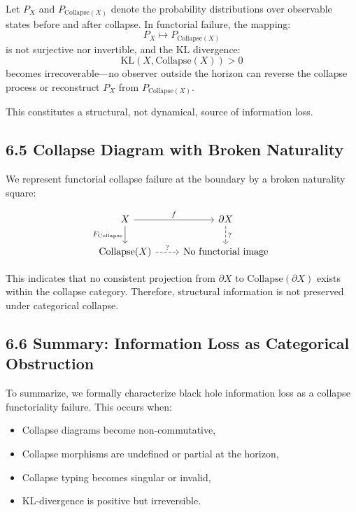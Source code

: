 \documentclass[11pt]{article}
\begin{document}
Let \( P_X \) and \( P_{\mathrm{Collapse}(X)} \) denote the probability distributions over observable states before and after collapse. In functorial failure, the mapping:
\[
P_X \mapsto P_{\mathrm{Collapse}(X)}
\]
is not surjective nor invertible, and the KL divergence:
\[
\mathrm{KL}(X, \mathrm{Collapse}(X)) > 0
\]
becomes irrecoverable—no observer outside the horizon can reverse the collapse process or reconstruct \( P_X \) from \( P_{\mathrm{Collapse}(X)} \).

This constitutes a structural, not dynamical, source of information loss.

\subsection*{6.5 Collapse Diagram with Broken Naturality}

We represent functorial collapse failure at the boundary by a broken naturality square:

\[
\begin{tikzcd}
X \arrow[r, "f"] \arrow[d, "F_{\mathrm{Collapse}}"']
& \partial X \arrow[d, dashed, "?"] \\
\mathrm{Collapse}(X) \arrow[r, dashed, "?"]
& \text{No functorial image}
\end{tikzcd}
\]

This indicates that no consistent projection from \( \partial X \) to \( \mathrm{Collapse}(\partial X) \) exists within the collapse category. Therefore, structural information is not preserved under categorical collapse.

\subsection*{6.6 Summary: Information Loss as Categorical Obstruction}

To summarize, we formally characterize black hole information loss as a collapse functoriality failure. This occurs when:

\begin{itemize}
    \item Collapse diagrams become non-commutative,
    \item Collapse morphisms are undefined or partial at the horizon,
    \item Collapse typing becomes singular or invalid,
    \item KL-divergence is positive but irreversible.
\end{itemize}
\end{document}
